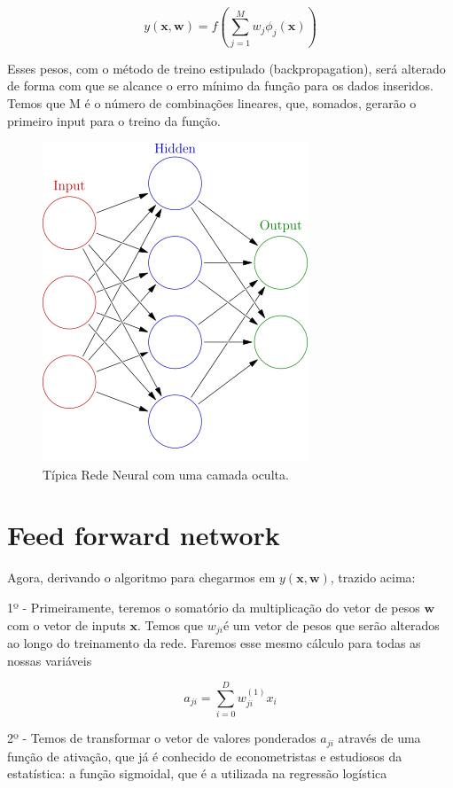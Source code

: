 \documentclass[]{book}
\theoremstyle{definition}
\theoremstyle{definition}
\theoremstyle{definition}
\theoremstyle{remark}
\begin{document}
\[
y(\mathbf{x, w})=f\left(\sum_{j=1}^M w_j\phi_j(\mathbf{x})\right)
\]

Esses pesos, com o método de treino estipulado (backpropagation), será alterado de forma com que se alcance o erro mínimo da função para os dados inseridos. Temos que M é o número de combinações lineares, que, somados, gerarão o primeiro input para o treino da função.

\begin{figure}

{\centering \includegraphics{./images/neural_network} 

}

\caption{Típica Rede Neural com uma camada oculta.}\label{fig:rede-neural}
\end{figure}

\hypertarget{feed-forward-network}{%
\section{Feed forward network}\label{feed-forward-network}}

Agora, derivando o algoritmo para chegarmos em \(y(\mathbf{x, w})\), trazido acima:

1º - Primeiramente, teremos o somatório da multiplicação do vetor de pesos \(\mathbf{w}\) com o vetor de inputs \(\mathbf{x}\). Temos que \(w_{ji}\)é um vetor de pesos que serão alterados ao longo do treinamento da rede. Faremos esse mesmo cálculo para todas as nossas variáveis

\[
  a_{ji} = \sum_{i = 0}^{D} w_{ji}^{(1)}x_i
\]

2º - Temos de transformar o vetor de valores ponderados \(a_{ji}\) através de uma função de ativação, que já é conhecido de econometristas e estudiosos da estatística: a função sigmoidal, que é a utilizada na regressão logística
\end{document}

